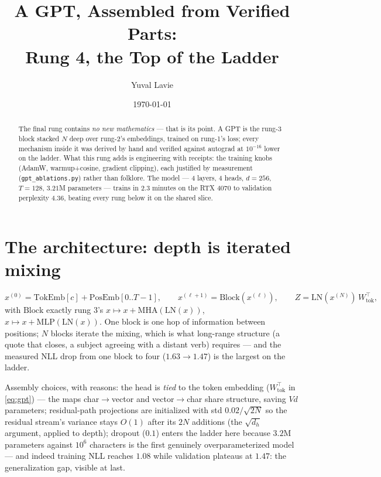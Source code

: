 \documentclass[11pt]{article}
\title{A GPT, Assembled from Verified Parts:\\
Rung 4, the Top of the Ladder}
\author{Yuval Lavie}
\date{\today}
\begin{document}
\maketitle

\begin{abstract}
The final rung contains \emph{no new mathematics} --- that is its
point. A GPT is the rung-3 block stacked $N$ deep over rung-2's
embeddings, trained on rung-1's loss; every mechanism inside it was
derived by hand and verified against autograd at $10^{-16}$ lower on
the ladder. What this rung adds is engineering with receipts: the
training knobs (AdamW, warmup+cosine, gradient clipping), each
justified by measurement (\texttt{gpt\_ablations.py}) rather than
folklore. The model --- 4 layers, 4 heads, $d = 256$, $T = 128$,
$3.21$M parameters --- trains in $2.3$ minutes on the RTX 4070 to
validation perplexity $\mathbf{4.36}$, beating every rung below it on
the shared slice.
\end{abstract}

\section{The architecture: depth is iterated mixing}

\begin{equation}
  x^{(0)} = \mathrm{TokEmb}[c] + \mathrm{PosEmb}[0..T{-}1],
  \qquad
  x^{(\ell+1)} = \mathrm{Block}(x^{(\ell)}),
  \qquad
  Z = \mathrm{LN}(x^{(N)})\, W_{\mathrm{tok}}^{\!\top},
  \label{eq:gpt}
\end{equation}
with $\mathrm{Block}$ exactly rung 3's
$x \mapsto x + \mathrm{MHA}(\mathrm{LN}(x))$,
$x \mapsto x + \mathrm{MLP}(\mathrm{LN}(x))$. One block is one hop of
information between positions; $N$ blocks iterate the mixing, which is
what long-range structure (a quote that closes, a subject agreeing
with a distant verb) requires --- and the measured NLL drop from one
block to four ($1.63 \to 1.47$) is the largest on the ladder.

Assembly choices, with reasons: the head is \emph{tied} to the token
embedding ($W_{\mathrm{tok}}^{\!\top}$ in \eqref{eq:gpt}) --- the maps
char$\to$vector and vector$\to$char share structure, saving $Vd$
parameters; residual-path projections are initialized with std
$0.02/\sqrt{2N}$ so the residual stream's variance stays $O(1)$ after
its $2N$ additions (the $\sqrt{d_h}$ argument, applied to depth);
dropout ($0.1$) enters the ladder here because $3.2$M parameters
against $10^6$ characters is the first genuinely overparameterized
model --- and indeed training NLL reaches $1.08$ while validation
plateaus at $1.47$: the generalization gap, visible at last.
\end{document}
